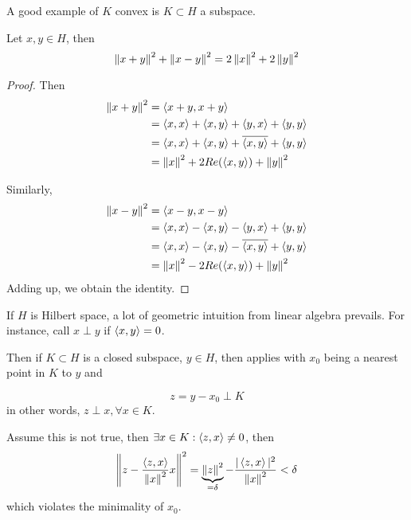 \documentclass{article}
\begin{document}
\begin{remark}
    A good example of $K$ convex is $K \subset H$ a subspace.
\end{remark}  

\begin{proposition}\rm\label{parallelogram}\nextline
	Let $x,y\in H$, then
        $$
		\left\|{x+y}\right\|^2+\left\|{x-y}\right\|^2=2\left\|{x}\right\|^2+2\left\|{y}\right\|^2
	$$
\end{proposition}
\begin{unexaminable}
    \begin{proof}
    Then
	\begin{equation}
		\begin{split}
			\left\|{x+y}\right\|^2&=\left<{x+y},{x+y}\right>\\
			&=\left<{x},{x}\right>+\left<{x},{y}\right>+\left<{y},{x}\right>+\left<{y},{y}\right>\\
			&=\left<{x},{x}\right>+\left<{x},{y}\right>+{\overline{\left<{x},{y}\right>}}+\left<{y},{y}\right>\\
			&=\left\|{x}\right\|^2+2Re(\left<{x},{y}\right>)+\left\|{y}\right\|^2
		\end{split}
	\end{equation}

	Similarly,
	\begin{equation}
		\begin{split}
			\left\|{x-y}\right\|^2&=\left<{x-y},{x-y}\right>\\
			&=\left<{x},{x}\right>-\left<{x},{y}\right>-\left<{y},{x}\right>+\left<{y},{y}\right>\\
			&=\left<{x},{x}\right>-\left<{x},{y}\right>-{\overline{\left<{x},{y}\right>}}+\left<{y},{y}\right>\\
			&=\left\|{x}\right\|^2-2Re(\left<{x},{y}\right>)+\left\|{y}\right\|^2
		\end{split}
	\end{equation}
 Adding up, we obtain the identity.  
\end{proof}
\end{unexaminable}


If $H$ is Hilbert space,  a lot of geometric intuition from linear algebra prevails. For instance, call $x \perp y$ if $\left<{x},{y}\right>=0$.  

Then if $K\subset H$ is a closed subspace, $y \in H$, then  applies with $x_0$ being a nearest point in $K$ to $y$ and  

$$
z = y-x_0 \perp K
$$  
in other words, $z\perp x, \forall x \in K$.  

Assume this is not true, then $\exists x \in K: \left<{z},{x}\right> \neq 0$, then  
$$
\left\|{z - \frac{\left<{z},{x}\right>}{\left\|{x}\right\|^2}x}\right\|^2 = \underbrace{\left\|{z}\right\|^2}_{=\delta} - \frac{|\left<{z},{x}\right>|^2}{\left\|{x}\right\|^2}<\delta
$$  
which violates the minimality of $x_0$.  
\end{document}
